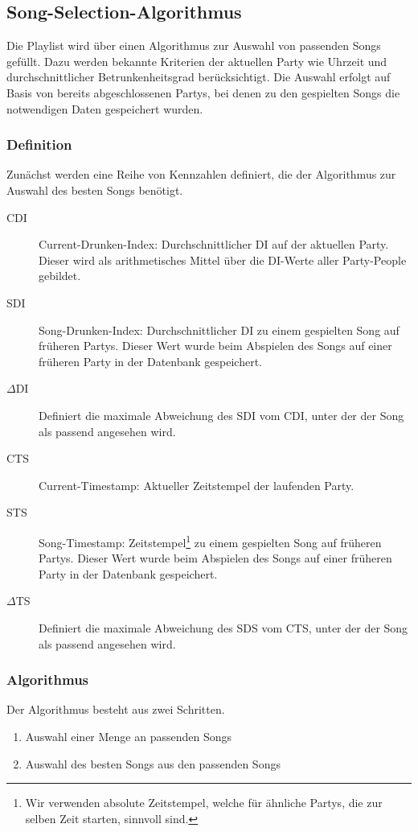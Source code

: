 \subsection{Song-Selection-Algorithmus}
\label{sec:SongSelect}
Die Playlist wird über einen Algorithmus zur Auswahl von passenden Songs gefüllt. Dazu werden bekannte Kriterien der aktuellen Party wie Uhrzeit und durchschnittlicher Betrunkenheitsgrad berücksichtigt. Die Auswahl erfolgt auf Basis von bereits abgeschlossenen Partys, bei denen zu den gespielten Songs die notwendigen Daten gespeichert wurden.

\subsubsection{Definition}
Zunächst werden eine Reihe von Kennzahlen definiert, die der Algorithmus zur Auswahl des besten Songs benötigt.

\begin{description}
	\item[CDI] Current-Drunken-Index: Durchschnittlicher DI auf der aktuellen Party. Dieser wird als arithmetisches Mittel über die DI-Werte aller Party-People gebildet.
	\item[SDI] Song-Drunken-Index: Durchschnittlicher DI zu einem gespielten Song auf früheren Partys. Dieser Wert wurde beim Abspielen des Songs auf einer früheren Party in der Datenbank gespeichert.
	\item[$\Delta$DI] Definiert die maximale Abweichung des SDI vom CDI, unter der der Song als passend angesehen wird.
	\item[CTS] Current-Timestamp: Aktueller Zeitstempel der laufenden Party.
	\item[STS] Song-Timestamp: Zeitstempel\footnote{Wir verwenden absolute Zeitstempel, welche für ähnliche Partys, die zur selben Zeit starten, sinnvoll sind.} zu einem gespielten Song auf früheren Partys. Dieser Wert wurde beim Abspielen des Songs auf einer früheren Party in der Datenbank gespeichert.
	\item[$\Delta$TS] Definiert die maximale Abweichung des SDS vom CTS, unter der der Song als passend angesehen wird.
\end{description}

\subsubsection{Algorithmus}
Der Algorithmus besteht aus zwei Schritten.
\begin{enumerate}
	\item Auswahl einer Menge an passenden Songs
	\item Auswahl des besten Songs aus den passenden Songs
\end{enumerate}

